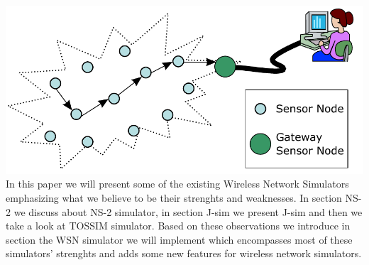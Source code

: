 
\includegraphics{img/WSN.pdf}
\\
In this paper we will present some of the existing Wireless Network
Simulators emphasizing what we believe to be their strenghts and weaknesses. 
In section NS-2 we discuss about NS-2 simulator, in section J-sim we present
J-sim and then we take a look at TOSSIM simulator. Based on these observations
we introduce in section \codename  the WSN simulator we will implement which
encompasses most of these simulators' strenghts and adds some new features
for wireless network simulators.
